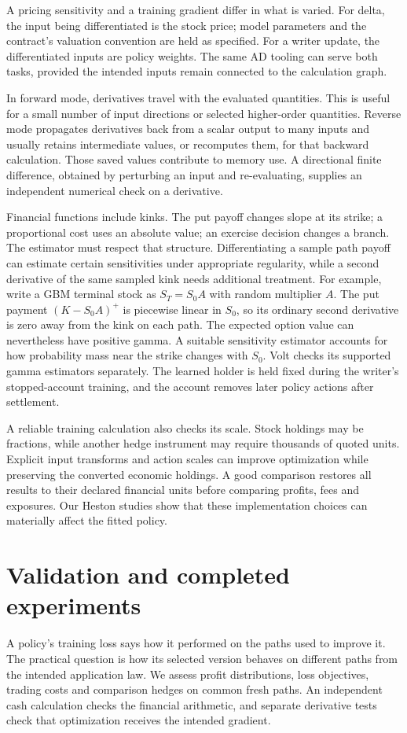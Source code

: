 \documentclass[8pt]{strategynet-journal}
\begin{document}
\begin{SNcolumns}
A pricing sensitivity and a training gradient differ in what is varied.
For delta, the input being differentiated is the stock price; model parameters
and the contract's valuation convention are held as specified. For a writer
update, the differentiated inputs are policy weights. The same AD tooling
can serve both tasks, provided the intended inputs remain connected to the
calculation graph.

In forward mode, derivatives travel with the evaluated quantities. This is
useful for a small number of input directions or selected higher-order
quantities. Reverse mode propagates derivatives back from a scalar output
to many inputs and usually retains intermediate values, or recomputes them,
for that backward calculation. Those saved values contribute to memory use.
A directional finite difference, obtained by perturbing an input and
re-evaluating, supplies an independent numerical check on a derivative.

Financial functions include kinks. The put payoff changes slope at its strike;
a proportional cost uses an absolute value; an exercise decision changes a
branch. The estimator must respect that structure. Differentiating a sample
path payoff can estimate certain sensitivities under appropriate regularity,
while a second derivative of the same sampled kink needs additional treatment.
For example, write a GBM terminal stock as $S_T=S_0A$ with random multiplier
$A$. The put payment $(K-S_0A)^+$ is piecewise linear in $S_0$, so its ordinary
second derivative is zero away from the kink on each path. The expected
option value can nevertheless have positive gamma. A suitable sensitivity
estimator accounts for how probability mass near the strike changes with $S_0$.
Volt checks its supported gamma estimators separately. The learned
holder is held fixed during the writer's stopped-account training, and the
account removes later policy actions after settlement.

A reliable training calculation also checks its scale. Stock holdings may be
fractions, while another hedge instrument may require thousands of quoted
units. Explicit input transforms and action scales can improve optimization
while preserving the converted economic holdings. A good comparison restores
all results to their declared financial units before comparing profits,
fees and exposures. Our Heston studies show that these implementation choices
can materially affect the fitted policy.

\section{Validation and completed experiments}\label{sec:evidence}
A policy's training loss says how it performed on the paths used to improve
it. The practical question is how its selected version behaves on different
paths from the intended application law. We assess profit distributions,
loss objectives, trading costs and comparison hedges on common fresh paths.
An independent cash calculation checks the financial arithmetic, and separate
derivative tests check that optimization receives the intended gradient.


\end{SNcolumns}
\end{document}
